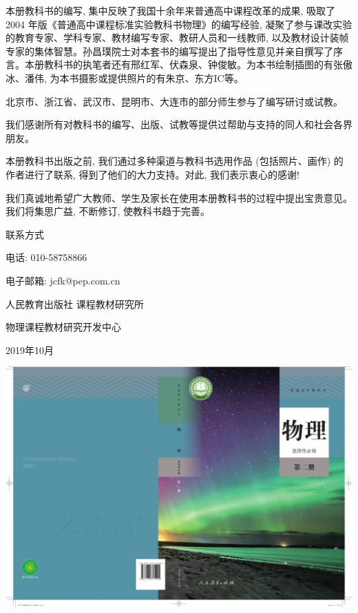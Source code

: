 \documentclass[10pt]{article}
\begin{document}
本册教科书的编写, 集中反映了我国十余年来普通高中课程改革的成果, 吸取了 2004 年版《普通高中课程标准实验教科书物理》的编写经验, 凝聚了参与课改实验的教育专家、学科专家、教材编写专家、教研人员和一线教师, 以及教材设计装帧专家的集体智慧。孙昌璞院士对本套书的编写提出了指导性意见并亲自撰写了序言。本册教科书的执笔者还有邢红军、伏森泉、钟俊敏。为本书绘制插图的有张傲冰、潘伟, 为本书摄影或提供照片的有朱京、东方IC等。

北京市、浙江省、武汉市、昆明市、大连市的部分师生参与了编写研讨或试教。

我们感谢所有对教科书的编写、出版、试教等提供过帮助与支持的同人和社会各界朋友。

本册教科书出版之前, 我们通过多种渠道与教科书选用作品 (包括照片、画作) 的作者进行了联系, 得到了他们的大力支持。对此, 我们表示衷心的感谢!

我们真诚地希望广大教师、学生及家长在使用本册教科书的过程中提出宝贵意见。我们将集思广益, 不断修订, 使教科书趋于完善。

联系方式

电话: 010-58758866

电子邮箱: jcfk@pep.com.cn

人民教育出版社 课程教材研究所

物理课程教材研究开发中心

2019年10月

\begin{center}
\includegraphics[max width=1.0\textwidth]{images/01910e72-c5b7-7ed5-a6d4-fb3a5faefc32_122_912947.jpg}
\end{center}
\end{document}
